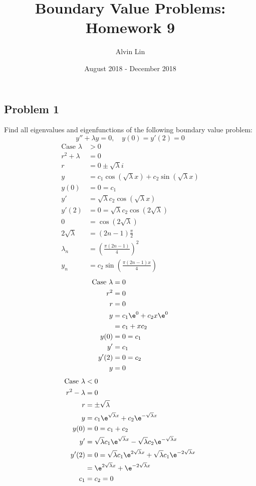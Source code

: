 \documentclass{math}
\title{Boundary Value Problems: Homework 9}
\author{Alvin Lin}
\date{August 2018 - December 2018}
\begin{document}
\maketitle

\subsection*{Problem 1}
Find all eigenvalues and eigenfunctions of the following boundary value problem:
\[ y''+\lambda y = 0, \quad y(0) = y'(2) = 0 \]
\begin{align*}
  \text{Case }\lambda &> 0 \\
  r^2+\lambda &= 0 \\
  r &= 0\pm\sqrt{\lambda}i \\
  y &= c_1\cos(\sqrt{\lambda}x)+c_2\sin(\sqrt{\lambda}x) \\
  y(0) &= 0 = c_1 \\
  y' &= \sqrt{\lambda}c_2\cos(\sqrt{\lambda}x) \\
  y'(2) &= 0 = \sqrt{\lambda}c_2\cos(2\sqrt{\lambda}) \\
  0 &= \cos(2\sqrt{\lambda}) \\
  2\sqrt{\lambda} &= (2n-1)\frac{\pi}{2} \\
  \lambda_n &= \left(\frac{\pi(2n-1)}{4}\right)^2 \\
  y_n &= c_2\sin\left(\frac{\pi(2n-1)x}{4}\right)
\end{align*}
\begin{align*}
  \text{Case }\lambda &= 0 \\
  r^2 &= 0 \\
  r &= 0 \\
  y &= c_1\e^{0}+c_2x\e^{0} \\
  &= c_1+xc_2 \\
  y(0) &= 0 = c_1 \\
  y' &= c_1 \\
  y'(2) &= 0 = c_2 \\
  y &= 0
\end{align*}
\begin{align*}
  \text{Case }\lambda &< 0 \\
  r^2-\lambda &= 0 \\
  r &= \pm\sqrt{\lambda} \\
  y &= c_1\e^{\sqrt{\lambda}x}+c_2\e^{-\sqrt{\lambda}x} \\
  y(0) &= 0 = c_1+c_2 \\
  y' &= \sqrt{\lambda}c_1\e^{\sqrt{\lambda}x}-
    \sqrt{\lambda}c_2\e^{-\sqrt{\lambda}x} \\
  y'(2) &= 0 = \sqrt{\lambda}c_1\e^{2\sqrt{\lambda}x}+
    \sqrt{\lambda}c_1\e^{-2\sqrt{\lambda}x} \\
  &= \e^{2\sqrt{\lambda}x}+\e^{-2\sqrt{\lambda}x} \\
  c_1 &= c_2 = 0
\end{align*}
\end{document}
